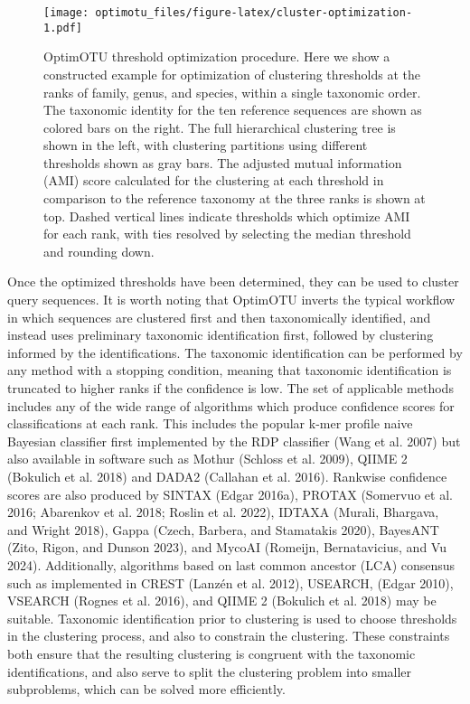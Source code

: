 \documentclass[
]{article}
\begin{document}
\begin{figure}
\centering
\texttt{[image: optimotu\_files/figure-latex/cluster-optimization-1.pdf]}
\caption{\label{fig:cluster-optimization}OptimOTU threshold optimization procedure.
Here we show a constructed example for optimization of clustering thresholds at the ranks of family, genus, and species, within a single taxonomic order.
The taxonomic identity for the ten reference sequences are shown as colored bars on the right.
The full hierarchical clustering tree is shown in the left, with clustering partitions using different thresholds shown as gray bars.
The adjusted mutual information (AMI) score calculated for the clustering at each threshold in comparison to the reference taxonomy at the three ranks is shown at top.
Dashed vertical lines indicate thresholds which optimize AMI for each rank, with ties resolved by selecting the median threshold and rounding down.}
\end{figure}

Once the optimized thresholds have been determined, they can be used to cluster query sequences.
It is worth noting that OptimOTU inverts the typical workflow in which sequences are clustered first and then taxonomically identified, and instead uses preliminary taxonomic identification first, followed by clustering informed by the identifications.
The taxonomic identification can be performed by any method with a stopping condition, meaning that taxonomic identification is truncated to higher ranks if the confidence is low.
The set of applicable methods includes any of the wide range of algorithms which produce confidence scores for classifications at each rank.
This includes the popular k-mer profile naive Bayesian classifier first implemented by the RDP classifier (Wang et al. 2007) but also available in software such as Mothur (Schloss et al. 2009), QIIME 2 (Bokulich et al. 2018) and DADA2 (Callahan et al. 2016).
Rankwise confidence scores are also produced by SINTAX (Edgar 2016a), PROTAX (Somervuo et al. 2016; Abarenkov et al. 2018; Roslin et al. 2022), IDTAXA (Murali, Bhargava, and Wright 2018), Gappa (Czech, Barbera, and Stamatakis 2020), BayesANT (Zito, Rigon, and Dunson 2023), and MycoAI (Romeijn, Bernatavicius, and Vu 2024).
Additionally, algorithms based on last common ancestor (LCA) consensus such as implemented in CREST (Lanzén et al. 2012), USEARCH, (Edgar 2010), VSEARCH (Rognes et al. 2016), and QIIME 2 (Bokulich et al. 2018) may be suitable.
Taxonomic identification prior to clustering is used to choose thresholds in the clustering process, and also to constrain the clustering.
These constraints both ensure that the resulting clustering is congruent with the taxonomic identifications, and also serve to split the clustering problem into smaller subproblems, which can be solved more efficiently.
\end{document}
